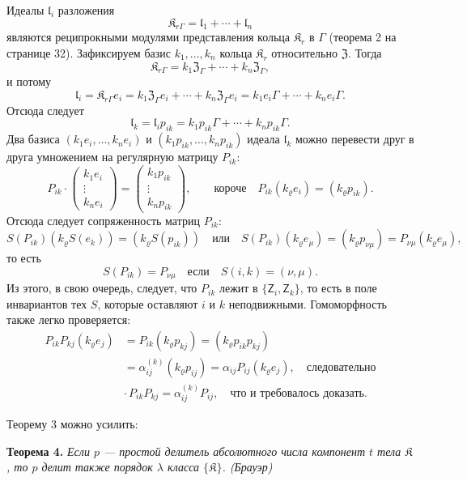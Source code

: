 \documentclass[11pt]{article}
\begin{document}
Идеалы \(\mathfrak l_i\) разложения
\[
\mathfrak K_{r\Gamma}=\mathfrak l_1+\cdots+\mathfrak l_n
\]
являются реципрокными модулями представления кольца \(\mathfrak K_r\) в \(\Gamma\) (теорема 2 на странице 32). Зафиксируем базис \(k_1,\ldots,k_n\) кольца \(\mathfrak K_r\) относительно \(\mathfrak Z\). Тогда
\[
\mathfrak K_{r\Gamma}=k_1\mathfrak Z_\Gamma+\cdots+k_n\mathfrak Z_\Gamma,
\]
и потому
\[
\mathfrak l_i=\mathfrak K_{r\Gamma}e_i
=k_1\mathfrak Z_\Gamma e_i+\cdots+k_n\mathfrak Z_\Gamma e_i
=k_1e_i\Gamma+\cdots+k_ne_i\Gamma.
\]
Отсюда следует
\[
\mathfrak l_k=\mathfrak l_i p_{ik}
=k_1p_{ik}\Gamma+\cdots+k_np_{ik}\Gamma.
\]
Два базиса \((k_1e_i,\ldots,k_ne_i)\) и \((k_1p_{ik},\ldots,k_np_{ik})\) идеала \(\mathfrak l_k\) можно перевести друг в друга умножением на регулярную матрицу \(P_{ik}\):
\[
P_{ik}\cdot
\begin{pmatrix}
k_1e_i\\ \vdots\\ k_ne_i
\end{pmatrix}
=
\begin{pmatrix}
k_1p_{ik}\\ \vdots\\ k_np_{ik}
\end{pmatrix},
\qquad
\text{короче}\quad
P_{ik}(k_\varrho e_i)=(k_\varrho p_{ik}).
\]
Отсюда следует сопряженность матриц \(P_{ik}\):
\[
S(P_{ik})(k_\varrho S(e_k))=(k_\varrho S(p_{ik}))
\quad\text{или}\quad
S(P_{ik})(k_\varrho e_\mu)=(k_\varrho p_{\nu\mu})
=P_{\nu\mu}(k_\varrho e_\mu),
\]
то есть
\[
S(P_{ik})=P_{\nu\mu}\quad\text{если}\quad S(i,k)=(\nu,\mu).
\]
Из этого, в свою очередь, следует, что \(P_{ik}\) лежит в \(\{\mathsf{Z}_i,\mathsf{Z}_k\}\), то есть в поле инвариантов тех \(S\), которые оставляют \(i\) и \(k\) неподвижными. Гомоморфность также легко проверяется:
\[
\begin{split}
P_{ik}P_{kj}(k_\varrho e_j)
&=P_{ik}(k_\varrho p_{kj})
=(k_\varrho p_{ik}p_{kj})\\
&=\alpha_{ij}^{(k)}(k_\varrho p_{ij})
=\alpha_{ij}P_{ij}(k_\varrho e_j),
\quad\text{следовательно}\\
&\cdot\, P_{ik}P_{kj}=\alpha_{ij}^{(k)}P_{ij},
\quad\text{что и требовалось доказать.}
\end{split}
\]

Теорему 3 можно усилить:

\textbf{Теорема 4.} \emph{Если \(p\) --- простой делитель абсолютного числа компонент \(t\) тела \(\mathfrak K\), то \(p\) делит также порядок \(\lambda\) класса \(\{\mathfrak K\}\). (Брауэр)}
\end{document}
